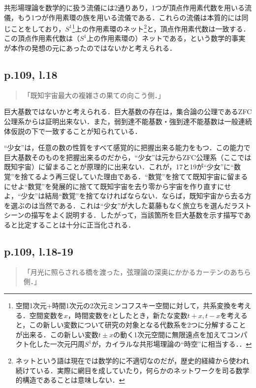 \documentclass[10pt, a5paper, twoside]{jsarticle}
\theoremstyle{definition}
\begin{document}
			共形場理論を数学的に扱う流儀には2通りあり，1つが頂点作用素代数を用いる流儀，もう1つが作用素環の族を用いる流儀である．これらの流儀は本質的には同じことをしており，$S^1$\footnote{空間1次元+時間1次元の2次元ミンコフスキー空間に対して，共系変換を考える．空間変数を$x$，時間変数を$t$としたとき，新たな変数$t+x, t-x$を考えると，この新しい変数について研究の対象となる代数系を2つに分解することが出来る．この新しい変数$t \pm x$の動く1次元空間に無限遠点を加えてコンパクト化した一次元円周$S^1$が，カイラルな共形場理論の“時空”に相当する．\cite{kawa}．}上の作用素環のネット\footnote{ネットという語は現在では数学的に不適切なのだが，歴史的経緯から使われ続けている．実際に網目を成していたり，何らかのネットワークを司る数学的構造であることは意味しない．}と，頂点作用素代数は一致する\cite{kawa}．この頂点作用素代数は（$S^1$上の作用素環の）ネットである，という数学的事実が本作の発想の元にあったのではないかと考えられる．

		\subsection{p.109, l.18}

			\begin{quote}

				「既知宇宙最大の複雑さの果ての向こう側．」
				
			\end{quote}

			巨大基数ではないかと考えられる．巨大基数の存在は，集合論の公理であるZFC公理系からは証明出来ない．また，弱到達不能基数・強到達不能基数は一般連続体仮説の下で一致することが知られている．

			“少女”は，任意の数の性質をすべて感覚的に把握出来る能力をもつ．この能力で巨大基数そのものを把握出来るのだから，“少女”は元からZFC公理系（ここでは既知宇宙）に留まることが原理的に出来ない．これが，17と19が“少女”に“数覚”を捨てるよう再三促していた理由である．“数覚”を捨てて既知宇宙に留まるにせよ“数覚”を発展的に捨てて既知宇宙を去り零から宇宙を作り直すにせよ，“少女”は結局“数覚”を捨てなければならない．ならば，既知宇宙から去る方を選ぶのは当然である．これは“少女”が大した葛藤もなく旅立ちを選んだラストシーンの描写をよく説明する．したがって，当該箇所を巨大基数を示す描写であると比定することは十分に正当化される．

		\subsection{p.109, l.18-19}

			\begin{quote}

				「月光に照らされる橋を渡った，弦理論の深奥にかかるカーテンのあちら側．」
				
			\end{quote}
\end{document}
